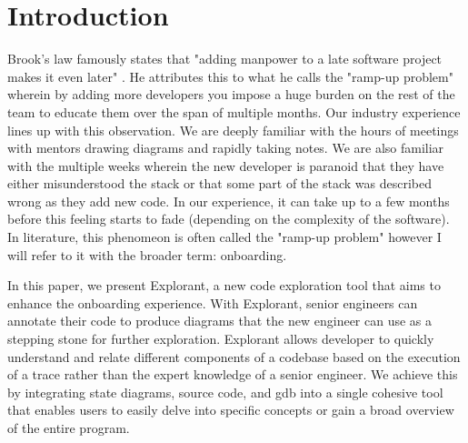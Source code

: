 \chapter{Introduction}




Brook's law famously states that "adding manpower to a late software project makes it even later" \cite{onboarding-brooks}. He attributes this to what he calls the "ramp-up problem" \cite{onboarding-ramp} wherein by adding more developers you impose a huge burden on the rest of the team to educate them over the span of multiple months. Our industry experience lines up with this observation. We are deeply familiar with the hours of meetings with mentors drawing diagrams and rapidly taking notes. We are also familiar with the multiple weeks wherein the new developer is paranoid that they have either misunderstood the stack or that some part of the stack was described wrong as they add new code. In our experience, it can take up to a few months before this feeling starts to fade (depending on the complexity of the software). In literature, this phenomeon is often called the "ramp-up problem" \cite{onboarding-ramp} however I will refer to it with the broader term: onboarding. 

In this paper, we present Explorant, a new code exploration tool that aims to enhance the onboarding experience. With Explorant, senior engineers can annotate their code to produce diagrams that the new engineer can use as a stepping stone for further exploration. Explorant allows developer to quickly understand and relate different components of a codebase based on the execution of a trace rather than the expert knowledge of a senior engineer. We achieve this by integrating state diagrams, source code, and gdb into a single cohesive tool that enables users to easily delve into specific concepts or gain a broad overview of the entire program.

